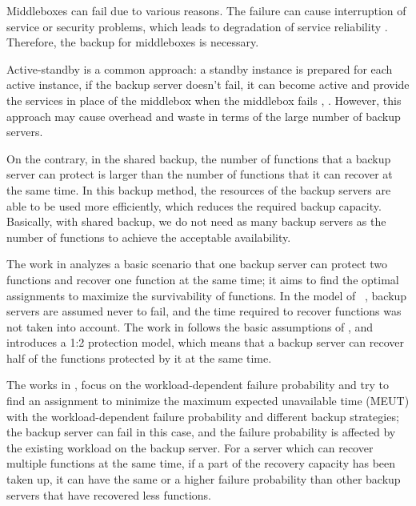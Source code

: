 \documentclass[conference]{IEEEtran}
\begin{document}
Middleboxes can fail due to various reasons. The failure can cause interruption of service or security problems, which leads to degradation of service reliability \cite{potharaju2013demystifying}. Therefore, the backup for middleboxes is necessary.

Active-standby is a common approach: a standby instance is prepared for each active instance, if the backup server doesn't fail, it can become active and provide the services in place of the middlebox when the middlebox fails \cite{kanizo2017optimizing}, \cite{cully2008remus}. However, this approach may cause overhead and waste in terms of the large number of backup servers.


On the contrary, in the shared backup, the number of functions that a backup server can protect is larger than the number of functions that it can recover at the same time. In this backup method, the resources of the backup servers are able to be used more efficiently, which reduces the required backup capacity. Basically, with shared backup, we do not need as many backup servers as the number of functions to achieve the acceptable availability.

The work in \cite{kanizo2017optimizing} analyzes a basic scenario that one backup server can protect two functions and recover one function at the same time; it aims to find the optimal assignments to maximize the survivability of functions. In the model of ~\cite{kanizo2017optimizing}, backup servers are assumed never to fail, and the time required to recover functions was not taken into account. The work in \cite{fujita2021shared} follows the basic assumptions of \cite{kanizo2017optimizing}, and introduces a 1:2 protection model, which means that a backup server can recover half of the functions protected by it at the same time. 

The works in \cite{zhu2020multiple}, \cite{zhu2021optimization} focus on the workload-dependent failure probability and try to find an assignment to minimize the maximum expected unavailable time (MEUT) with the workload-dependent failure
probability and different backup strategies; the backup server can fail in this case, and the failure probability is affected by the existing workload on the backup server. For a server which can recover multiple functions at the same time, if a part of the recovery capacity has been taken up, it can have the same or a higher failure probability than other backup servers that have recovered less functions. 
\end{document}
